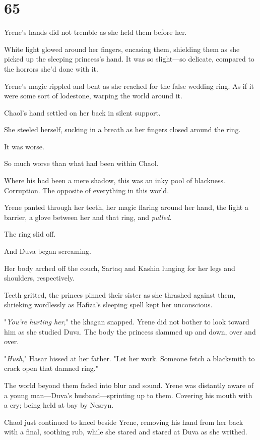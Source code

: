 
\chapter{65}

Yrene's hands did not tremble as she held them before her.

White light glowed around her fingers, encasing them, shielding them as she picked up the sleeping princess's hand.
It was so slight---so delicate, compared to the horrors she'd done with it.

Yrene's magic rippled and bent as she reached for the false wedding ring.
As if it were some sort of lodestone, warping the world around it.

Chaol's hand settled on her back in silent support.

She steeled herself, sucking in a breath as her fingers closed around the ring.

It was worse.

So much worse than what had been within Chaol.

Where his had been a mere shadow, this was an inky pool of blackness.
Corruption.
The opposite of everything in this world.

Yrene panted through her teeth, her magic flaring around her hand, the light a barrier, a glove between her and that ring, and \emph{pulled}.

The ring slid off.

And Duva began screaming.

Her body arched off the couch, Sartaq and Kashin lunging for her legs and shoulders, respectively.

Teeth gritted, the princes pinned their sister as she thrashed against them, shrieking wordlessly as Hafiza's sleeping spell kept her unconscious.

"\emph{You're hurting her}," the khagan snapped.
Yrene did not bother to look toward him as she studied Duva.
The body the princess slammed up and down, over and over.

"\emph{Hush}," Hasar hissed at her father.
"Let her work.
Someone fetch a blacksmith to crack open that damned ring."

The world beyond them faded into blur and sound.
Yrene was distantly aware of a young man---Duva's husband---sprinting up to them.
Covering his mouth with a cry; being held at bay by Nesryn.

Chaol just continued to kneel beside Yrene, removing his hand from her back with a final, soothing rub, while she stared and stared at Duva as she writhed.


